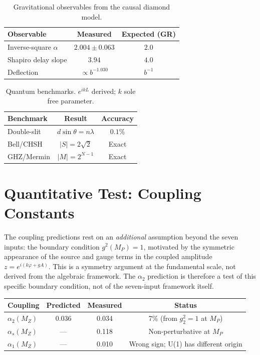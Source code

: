 \documentclass[12pt,a4paper]{article}
\begin{document}
\begin{table}[h]
\centering
\begin{tabular}{lcc}
\toprule
Observable & Measured & Expected (GR) \\
\midrule
Inverse-square $\alpha$ & $2.004 \pm 0.063$ & $2.0$ \\
Shapiro delay slope & $3.94$ & $4.0$ \\
Deflection & $\propto b^{-1.030}$ & $b^{-1}$ \\
\bottomrule
\end{tabular}
\caption{Gravitational observables from the causal diamond model.}
\label{tab:gr}
\end{table}

\begin{table}[h]
\centering
\begin{tabular}{lcc}
\toprule
Benchmark & Result & Accuracy \\
\midrule
Double-slit & $d\sin\theta = n\lambda$ & $0.1\%$ \\
Bell/CHSH & $|S| = 2\sqrt{2}$ & Exact \\
GHZ/Mermin & $|M| = 2^{N-1}$ & Exact \\
\bottomrule
\end{tabular}
\caption{Quantum benchmarks. $e^{ikL}$ derived; $k$ sole free parameter.}
\label{tab:quantum}
\end{table}

\section{Quantitative Test: Coupling Constants}
\label{sec:couplings}

The coupling predictions rest on an \emph{additional} assumption beyond the seven inputs: the boundary condition $g^2(M_P) = 1$, motivated by the symmetric appearance of the source and gauge terms in the coupled amplitude $z = e^{i(k\varphi + gA)}$.  This is a symmetry argument at the fundamental scale, not derived from the algebraic framework.  The $\alpha_2$ prediction is therefore a test of this specific boundary condition, not of the seven-input framework itself.

\begin{center}
\begin{tabular}{lccc}
\toprule
Coupling & Predicted & Measured & Status \\
\midrule
$\alpha_2(M_Z)$ & 0.036 & 0.034 & 7\% (from $g_2^2 = 1$ at $M_P$) \\
$\alpha_s(M_Z)$ & --- & 0.118 & Non-perturbative at $M_P$ \\
$\alpha_1(M_Z)$ & --- & 0.010 & Wrong sign; U(1) has different origin \\
\bottomrule
\end{tabular}
\end{center}
\end{document}
